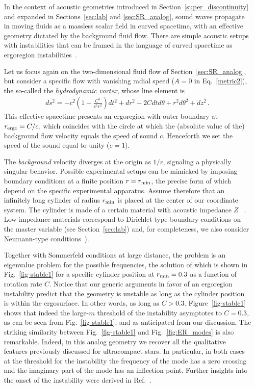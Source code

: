 \documentclass[11pt]{article}
\def\beq{\begin{eqnarray}}
\def\eeq{\end{eqnarray}}
\numberwithin{equation}{section} %
\begin{document}
%  
In the context of acoustic geometries introduced in Section~\ref{super_discontinuity} and expanded in Sections~\ref{sec:lab} and \ref{sec:SR_analog},
sound waves propagate in moving fluids as a massless scalar field in curved spacetime, with an effective geometry dictated by the background fluid flow.
There are simple acoustic setups with instabilities that can be framed in the language of curved spacetime as ergoregion instabilities~\cite{Oliveira:2014oja,Hod:2017lho}.


Let us focus again on the two-dimensional fluid flow of Section~\ref{sec:SR_analog}, but consider a specific flow with vanishing radial speed ($A=0$ in Eq.~\eqref{metric2}),
the so-called the {\it hydrodynamic vortex}, whose line element is
%
\beq
ds^2=-c^{2}\left(1-\frac{C^2}{c^2r^2} \right) dt^2+dr^2-2Cdtd\theta+r^2d\theta^2+dz^2\,.
\label{vortex}
\eeq
%
This effective spacetime presents an ergoregion with outer boundary at $r_{\rm ergo} = C/c$, which coincides with the circle at which the (absolute value of the) background flow velocity equals the speed of sound $c$. Henceforth we set the speed of the sound equal to unity ($c=1$).

The {\it background} velocity diverges at the origin as $1/r$, signaling a physically singular behavior.
Possible experimental setups can be mimicked by imposing boundary conditions at a finite
position $r=r_{\rm min}$, the precise form of which depend on the specific experimental apparatus.
 Assume therefore that an infinitely long cylinder of radius $r_{\rm min}$
is placed at the center of our coordinate system. The cylinder is made of a certain material with acoustic impedance $Z$~
\cite{Lax:1948}. Low-impedance materials correspond to Dirichlet-type boundary conditions on the master variable (see Section~\ref{sec:lab}) and, for completeness, we also consider Neumann-type conditions~\cite{Oliveira:2014oja}).


Together with Sommerfeld conditions at large distance, the problem is an eigenvalue problem for the possible frequencies, the 
solution of which is shown in Fig.~\ref{fig-stable1} for a specific cylinder position at $r_{\rm min}=0.3$ as a function of rotation rate $C$.
Notice that our generic arguments in favor of an ergoregion instability predict that the geometry is unstable as long as the cylinder position is within the ergosurface.
In other words, as long as $C>0.3$. Figure~\ref{fig-stable1} shows that indeed the large-$m$ threshold of the instability asymptotes to $C=0.3$, as can be seen from Fig.~\ref{fig-stable1}, and as anticipated from our discussion. 
The striking similarity between Fig.~\ref{fig-stable1} and Fig.~\ref{fig:ER_modes} is also remarkable. Indeed, in this analog geometry we recover all the qualitative features previously discussed for ultracompact stars. In particular, in both cases at the threshold for the instability the frequency of the mode has a zero crossing and the imaginary part of the mode has an inflection point.
%
Further insights into the onset of the instability were derived in Ref.~\cite{Hod:2014hda}.
\end{document}
